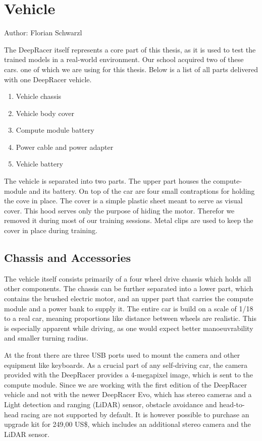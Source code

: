 \chapter{Vehicle}
Author: Florian Schwarzl

The DeepRacer itself represents a core part of this thesis, as it is used to test the trained models in a real-world environment. Our school acquired two of these cars. one of which we are using for this thesis. Below is a list of all parts delivered with one DeepRacer vehicle.

\begin{enumerate}
    \item Vehicle chassis
    \item Vehicle body cover
    \item Compute module battery
    \item Power cable and power adapter
    \item Vehicle battery
\end{enumerate}

The vehicle is separated into two parts. The upper part houses the compute-module and its battery. On top of the car are four small contraptions for holding the cove in place. The cover is a simple plastic sheet meant to serve as visual cover. This hood serves only the purpose of hiding the motor. Therefor we removed it during most of our training sessions. Metal clips are used to keep the cover in place during training.

\section{Chassis and Accessories}
The vehicle itself consists primarily of a four wheel drive chassis which holds all other components. The chassis can be further separated into a lower part, which contains the brushed electric motor, and an upper part that carries the compute module and a power bank to supply it. The entire car is build on a scale of 1/18 to a real car, meaning proportions like distance between wheels are realistic. This is especially apparent while driving, as one would expect better manoeuvrability and smaller turning radius.

At the front there are three USB ports used to mount the camera and other equipment like keyboards. As a crucial part of any self-driving car, the camera provided with the DeepRacer provides a 4-megapixel image, which is sent to the compute module. Since we are working with the first edition of the DeepRacer vehicle and not with the newer DeepRacer Evo, which has stereo cameras and a Light detection and ranging (LiDAR) sensor, obstacle avoidance and head-to-head racing are not supported by default. It is however possible to purchase an upgrade kit for 249,00 US\$, which includes an additional stereo camera and the LiDAR sensor.

